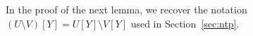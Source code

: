 \documentclass[12pt]{article}
\newcommand{\taurk}{\text{rk}^\tau}
\newtheorem{proposition}[theorem]{Proposition}
\theoremstyle{definition}
\theoremstyle{remark}
\begin{document}


In the proof of the next lemma, we recover the notation $(U\setminus V)[Y]=U[Y]\setminus V[Y]$ used in Section~\ref{sec:ntp}.
\end{document}
